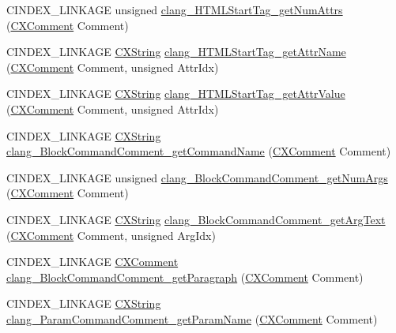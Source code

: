 \begin{DoxyCompactItemize}
\item 
C\+I\+N\+D\+E\+X\+\_\+\+L\+I\+N\+K\+A\+GE unsigned \mbox{\hyperlink{group__CINDEX__COMMENT_gaffb8098debd5b99c2345840a5f0e63e0}{clang\+\_\+\+H\+T\+M\+L\+Start\+Tag\+\_\+get\+Num\+Attrs}} (\mbox{\hyperlink{structCXComment}{C\+X\+Comment}} Comment)
\item 
C\+I\+N\+D\+E\+X\+\_\+\+L\+I\+N\+K\+A\+GE \mbox{\hyperlink{structCXString}{C\+X\+String}} \mbox{\hyperlink{group__CINDEX__COMMENT_ga4bdf958af343477fc70eb2b4822cd006}{clang\+\_\+\+H\+T\+M\+L\+Start\+Tag\+\_\+get\+Attr\+Name}} (\mbox{\hyperlink{structCXComment}{C\+X\+Comment}} Comment, unsigned Attr\+Idx)
\item 
C\+I\+N\+D\+E\+X\+\_\+\+L\+I\+N\+K\+A\+GE \mbox{\hyperlink{structCXString}{C\+X\+String}} \mbox{\hyperlink{group__CINDEX__COMMENT_gae674a07af38d28d67941c1c54909c5e8}{clang\+\_\+\+H\+T\+M\+L\+Start\+Tag\+\_\+get\+Attr\+Value}} (\mbox{\hyperlink{structCXComment}{C\+X\+Comment}} Comment, unsigned Attr\+Idx)
\item 
C\+I\+N\+D\+E\+X\+\_\+\+L\+I\+N\+K\+A\+GE \mbox{\hyperlink{structCXString}{C\+X\+String}} \mbox{\hyperlink{group__CINDEX__COMMENT_ga8fdde998537370477362a4f84bc03420}{clang\+\_\+\+Block\+Command\+Comment\+\_\+get\+Command\+Name}} (\mbox{\hyperlink{structCXComment}{C\+X\+Comment}} Comment)
\item 
C\+I\+N\+D\+E\+X\+\_\+\+L\+I\+N\+K\+A\+GE unsigned \mbox{\hyperlink{group__CINDEX__COMMENT_gacb447968ce9efdfdabbfca8918540cdf}{clang\+\_\+\+Block\+Command\+Comment\+\_\+get\+Num\+Args}} (\mbox{\hyperlink{structCXComment}{C\+X\+Comment}} Comment)
\item 
C\+I\+N\+D\+E\+X\+\_\+\+L\+I\+N\+K\+A\+GE \mbox{\hyperlink{structCXString}{C\+X\+String}} \mbox{\hyperlink{group__CINDEX__COMMENT_ga9faf08601d88c809a9a97a9826051990}{clang\+\_\+\+Block\+Command\+Comment\+\_\+get\+Arg\+Text}} (\mbox{\hyperlink{structCXComment}{C\+X\+Comment}} Comment, unsigned Arg\+Idx)
\item 
C\+I\+N\+D\+E\+X\+\_\+\+L\+I\+N\+K\+A\+GE \mbox{\hyperlink{structCXComment}{C\+X\+Comment}} \mbox{\hyperlink{group__CINDEX__COMMENT_gac6f2ffc8fdbe9394bd4bb7d54327c968}{clang\+\_\+\+Block\+Command\+Comment\+\_\+get\+Paragraph}} (\mbox{\hyperlink{structCXComment}{C\+X\+Comment}} Comment)
\item 
C\+I\+N\+D\+E\+X\+\_\+\+L\+I\+N\+K\+A\+GE \mbox{\hyperlink{structCXString}{C\+X\+String}} \mbox{\hyperlink{group__CINDEX__COMMENT_gaffd7aaf697c5eb3a3d2b508b5d806763}{clang\+\_\+\+Param\+Command\+Comment\+\_\+get\+Param\+Name}} (\mbox{\hyperlink{structCXComment}{C\+X\+Comment}} Comment)

\end{DoxyCompactItemize}
